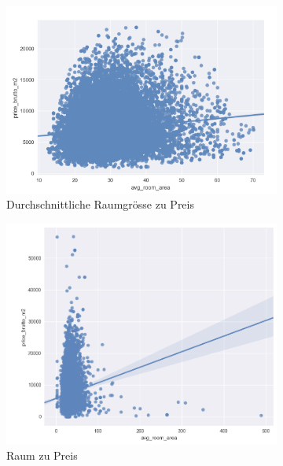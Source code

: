 \begin{figure}[h]
  \begin{subfigure}{.5\textwidth}
    \centering
    \includegraphics[width=\linewidth]{images/anhang/analysis/avg_room_to_price.png}
    \caption{Durchschnittliche Raumgrösse zu Preis}
  \end{subfigure}
  \begin{subfigure}{.5\textwidth}
    \centering
    \includegraphics[width=\linewidth]{images/anhang/analysis/Raum_zu_Preis.png}
    \caption{Raum zu Preis} 
  \end{subfigure}
  \begin{subfigure}{.5\textwidth}
    \centering

\end{subfigure}
\end{figure}
